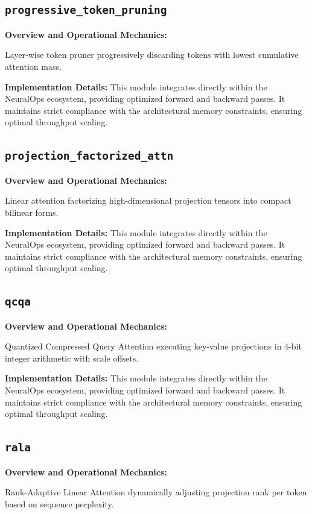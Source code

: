 \documentclass[10pt,twocolumn,letterpaper]{article}
\begin{document}
\subsection{\texttt{progressive\_token\_pruning}}
\textbf{Overview and Operational Mechanics:}

Layer-wise token pruner progressively discarding tokens with lowest cumulative attention mass.

\textbf{Implementation Details:}
This module integrates directly within the NeuralOps ecosystem, providing optimized forward and backward passes. It maintains strict compliance with the architectural memory constraints, ensuring optimal throughput scaling.

\subsection{\texttt{projection\_factorized\_attn}}
\textbf{Overview and Operational Mechanics:}

Linear attention factorizing high-dimensional projection tensors into compact bilinear forms.

\textbf{Implementation Details:}
This module integrates directly within the NeuralOps ecosystem, providing optimized forward and backward passes. It maintains strict compliance with the architectural memory constraints, ensuring optimal throughput scaling.

\subsection{\texttt{qcqa}}
\textbf{Overview and Operational Mechanics:}

Quantized Compressed Query Attention executing key-value projections in 4-bit integer arithmetic with scale offsets.

\textbf{Implementation Details:}
This module integrates directly within the NeuralOps ecosystem, providing optimized forward and backward passes. It maintains strict compliance with the architectural memory constraints, ensuring optimal throughput scaling.

\subsection{\texttt{rala}}
\textbf{Overview and Operational Mechanics:}

Rank-Adaptive Linear Attention dynamically adjusting projection rank per token based on sequence perplexity.
\end{document}
